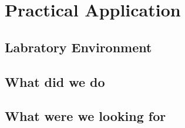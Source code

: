 \section{Practical Application}
\lipsum[1-2]
\subsection{Labratory Environment}
\lipsum[4-5]
\subsection{What did we do}
\lipsum[6]
\subsection{What were we looking for}
\lipsum[7]